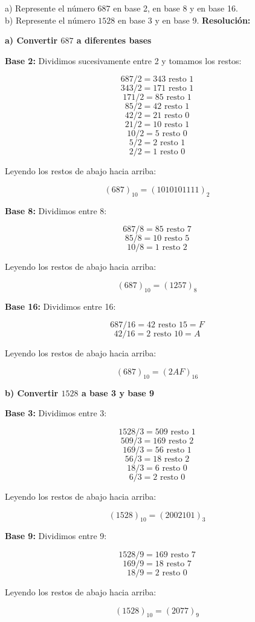 \documentclass[a4paper,12pt]{article}
\begin{document}
\begin{ejercicio}[title=Ejercicio 2]
a) Represente el número $687$ en base 2, en base 8 y en base 16. \\
b) Represente el número $1528$ en base 3 y en base 9.
\tcblower
\textbf{Resolución:}

\textbf{a) Convertir $687$ a diferentes bases}

\textbf{Base 2:} Dividimos sucesivamente entre 2 y tomamos los restos:

\[
687 / 2 = 343 \text{ resto } 1
\] 
\[
343 / 2 = 171 \text{ resto } 1
\] 
\[
171 / 2 = 85 \text{ resto } 1
\] 
\[
85 / 2 = 42 \text{ resto } 1
\] 
\[
42 / 2 = 21 \text{ resto } 0
\] 
\[
21 / 2 = 10 \text{ resto } 1
\] 
\[
10 / 2 = 5 \text{ resto } 0
\] 
\[
5 / 2 = 2 \text{ resto } 1
\] 
\[
2 / 2 = 1 \text{ resto } 0
\]

Leyendo los restos de abajo hacia arriba:

\[
(687)_{10} = \boxed{(1010101111)_2}
\]

\textbf{Base 8:} Dividimos entre 8:

\[
687 / 8 = 85 \text{ resto } 7
\] 
\[
85 / 8 = 10 \text{ resto } 5
\] 
\[
10 / 8 = 1 \text{ resto } 2
\]

Leyendo los restos de abajo hacia arriba:

\[
(687)_{10} = \boxed{(1257)_8}
\]

\textbf{Base 16:} Dividimos entre 16:

\[
687 / 16 = 42 \text{ resto } 15 = F
\] 
\[
42 / 16 = 2 \text{ resto } 10 = A
\]

Leyendo los restos de abajo hacia arriba:

\[
(687)_{10} = \boxed{(2AF)_{16}}
\]

\end{ejercicio}
\begin{ejercicio}[title=Ejercicio 2]
\textbf{b) Convertir $1528$ a base 3 y base 9}

\textbf{Base 3:} Dividimos entre 3:

\[
1528 / 3 = 509 \text{ resto } 1
\] 
\[
509 / 3 = 169 \text{ resto } 2
\] 
\[
169 / 3 = 56 \text{ resto } 1
\] 
\[
56 / 3 = 18 \text{ resto } 2
\] 
\[
18 / 3 = 6 \text{ resto } 0
\] 
\[
6 / 3 = 2 \text{ resto } 0
\]

Leyendo los restos de abajo hacia arriba:

\[
(1528)_{10} = \boxed{(2002101)_3}
\]

\textbf{Base 9:} Dividimos entre 9:

\[
1528 / 9 = 169 \text{ resto } 7
\] 
\[
169 / 9 = 18 \text{ resto } 7
\] 
\[
18 / 9 = 2 \text{ resto } 0
\]

Leyendo los restos de abajo hacia arriba:

\[
(1528)_{10} = \boxed{(2077)_9}
\]

\end{ejercicio}
\end{document}
